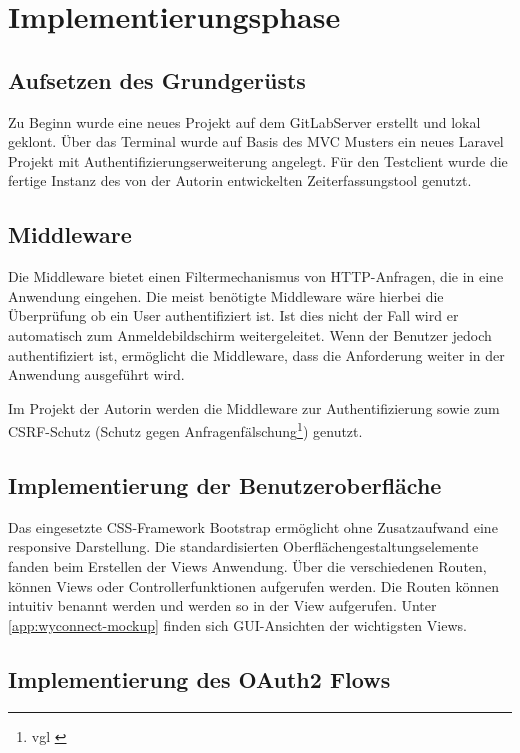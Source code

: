 \section{Implementierungsphase} 
\label{sec:Implementierungsphase}

\subsection{Aufsetzen des Grundgerüsts}
\label{sec:AufsetzenGrundgeruest}

Zu Beginn wurde eine neues Projekt auf dem GitLabServer erstellt und lokal geklont. Über das Terminal wurde auf Basis des MVC Musters ein neues Laravel Projekt mit Authentifizierungserweiterung angelegt. 
Für den Testclient wurde die fertige Instanz des von der Autorin entwickelten Zeiterfassungstool genutzt.

\subsection{Middleware}
\label{sec:Middleware}
Die Middleware bietet einen Filtermechanismus von HTTP-Anfragen, die in eine Anwendung eingehen. Die meist benötigte Middleware wäre hierbei die Überprüfung ob ein User authentifiziert ist. Ist dies nicht der Fall wird er automatisch zum Anmeldebildschirm weitergeleitet. Wenn der Benutzer jedoch authentifiziert ist, ermöglicht die Middleware, dass die Anforderung weiter in der Anwendung ausgeführt wird.

Im Projekt der Autorin werden die Middleware zur Authentifizierung sowie zum \acs{CSRF}-Schutz (Schutz gegen Anfragenfälschung\footnote{vgl \cite{CSRF}}) genutzt.

\subsection{Implementierung der Benutzeroberfläche}
\label{sec:ImplBenutzeroberflaeche}

Das eingesetzte CSS-Framework Bootstrap ermöglicht ohne Zusatzaufwand eine responsive Darstellung. Die standardisierten Oberflächengestaltungselemente fanden beim Erstellen der Views Anwendung. 
Über die verschiedenen Routen, können Views oder Controllerfunktionen aufgerufen werden. Die Routen können intuitiv benannt werden und werden so in der View aufgerufen.
Unter \ref{app:wyconnect-mockup} finden sich GUI-Ansichten der wichtigsten Views.

\subsection{Implementierung des OAuth2 Flows}
\label{sec:ImplementierungOAuth2}


